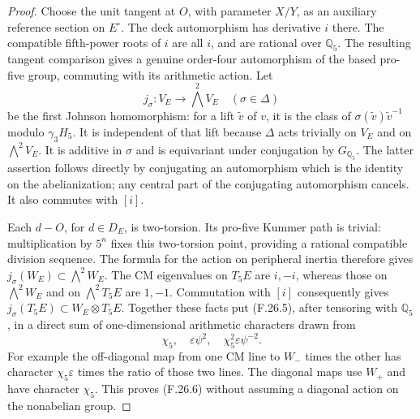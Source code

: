 \begin{proof}
Choose the unit tangent at $O$, with parameter $X/Y$,
as an auxiliary reference section on $E^\circ$.
The deck automorphism has derivative $i$ there.
The compatible fifth-power roots of $i$ are all $i$,
and are rational over $\mathbb Q_5$. The resulting tangent
comparison gives a genuine order-four automorphism of the
based pro-five group, commuting with its arithmetic action.
Let
\[
 j_\sigma:V_E\longrightarrow\bigwedge^2V_E
 \quad(\sigma\in\Delta)
 \tag{F.26.5}
\]
be the first Johnson homomorphism: for a lift $\widetilde v$
of $v$, it is the class of
$\sigma(\widetilde v)\widetilde v^{-1}$ modulo $\gamma_3H_5$.
It is independent of that lift because $\Delta$ acts trivially
on $V_E$ and on $\bigwedge^2V_E$.
It is additive in $\sigma$ and is equivariant under conjugation
by $G_{\mathbb Q_5}$. The latter assertion follows directly
by conjugating an automorphism which is the identity on the
abelianization; any central part of the conjugating
automorphism cancels. It also commutes with $[i]$.

Each $d-O$, for $d\in D_E$, is two-torsion. Its pro-five
Kummer path is trivial: multiplication by $5^n$ fixes this
two-torsion point, providing a rational compatible division
sequence. The formula for the action on peripheral inertia
therefore gives
$j_\sigma(W_E)\subset\bigwedge^2W_E$.
The CM eigenvalues on $T_5E$ are $i,-i$, whereas those on
$\bigwedge^2W_E$ and on $\bigwedge^2T_5E$ are $1,-1$.
Commutation with $[i]$ consequently gives
$j_\sigma(T_5E)\subset W_E\otimes T_5E$.
Together these facts put (F.26.5), after tensoring with
$\mathbb Q_5$, in a direct sum of one-dimensional arithmetic
characters drawn from
\[
             \chi_5,\quad
             \varepsilon\psi^2,\quad
             \chi_5^2\varepsilon\psi^{-2}.                 \tag{F.26.6}
\]
For example the off-diagonal map from one CM line to
$W_-$ times the other has character
$\chi_5\varepsilon$ times the ratio of those two lines.
The diagonal maps use $W_+$ and have character $\chi_5$.
This proves (F.26.6) without assuming a diagonal action on
the nonabelian group.


\end{proof}
